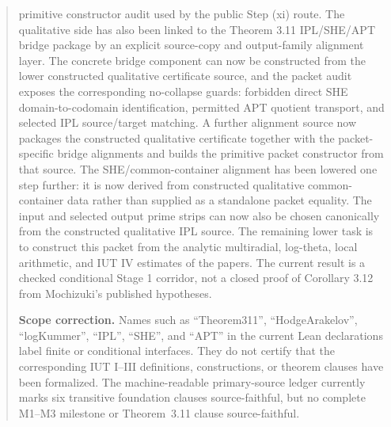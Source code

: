 \documentclass[11pt]{article}
\theoremstyle{plain}
\theoremstyle{definition}
\theoremstyle{remark}
\begin{document}
\begin{abstract}
primitive constructor audit used by the public Step (xi) route.  The qualitative
side has also been linked to the Theorem 3.11 IPL/SHE/APT bridge package by an
explicit source-copy and output-family alignment layer.  The concrete bridge
component can now be constructed from the lower constructed qualitative
certificate source, and the packet audit exposes the corresponding no-collapse
guards: forbidden direct SHE domain-to-codomain identification, permitted APT
quotient transport, and selected IPL source/target matching.  A further
alignment source now packages the constructed qualitative certificate together
with the packet-specific bridge alignments and builds the primitive packet
constructor from that source.  The SHE/common-container alignment has been
lowered one step further: it is now derived from constructed qualitative
common-container data rather than supplied as a standalone packet equality.  The
input and selected output prime strips can now also be chosen canonically from
the constructed qualitative IPL source.  The
remaining lower task is to construct this packet from the analytic multiradial,
log-theta, local arithmetic, and IUT IV estimates of the papers.  The current
result is a checked conditional Stage 1 corridor, not a closed proof of
Corollary 3.12 from Mochizuki's published hypotheses.

\medskip
\noindent\textbf{Scope correction.}
Names such as ``Theorem311'', ``HodgeArakelov'', ``logKummer'', ``IPL'',
``SHE'', and ``APT'' in the current Lean declarations label finite or
conditional interfaces. They do not certify that the corresponding IUT I--III
definitions, constructions, or theorem clauses have been formalized. The
machine-readable primary-source ledger currently marks six transitive
foundation clauses source-faithful, but no complete M1--M3 milestone or
Theorem~3.11 clause source-faithful.


\end{abstract}
\end{document}
